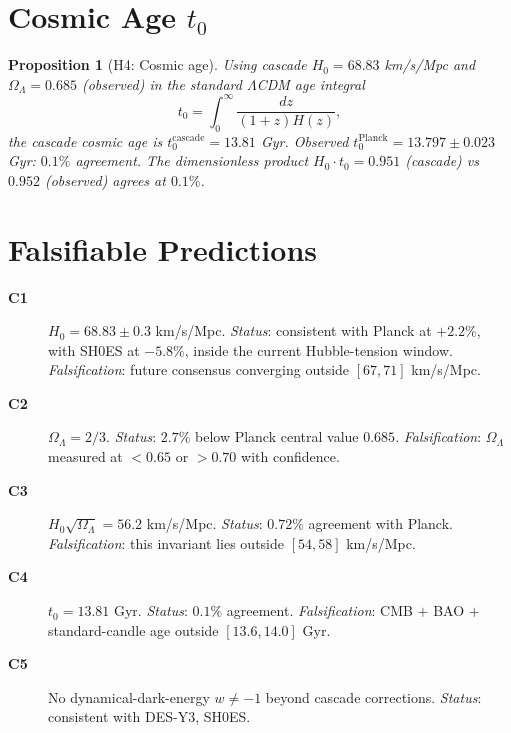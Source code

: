 \documentclass[12pt]{article}
\newtheorem{proposition}[theorem]{Proposition}
\theoremstyle{definition}
\theoremstyle{remark}
\begin{document}
\section{Cosmic Age $t_0$}\label{sec:age}

\begin{proposition}[H4: Cosmic age]\label{prop:age}
Using cascade $H_0 = 68.83$ km/s/Mpc and $\Omega_\Lambda = 0.685$ (observed) in the standard $\Lambda$CDM age integral
\begin{equation}
t_0 = \int_0^\infty \frac{dz}{(1+z) H(z)},
\end{equation}
the cascade cosmic age is $t_0^{\mathrm{cascade}} = 13.81$ Gyr. Observed $t_0^{\mathrm{Planck}} = 13.797 \pm 0.023$ Gyr: $0.1\%$ agreement. The dimensionless product $H_0 \cdot t_0 = 0.951$ (cascade) vs $0.952$ (observed) agrees at $0.1\%$.
\end{proposition}

\section{Falsifiable Predictions}\label{sec:predictions}

\begin{description}
\item[\textbf{C1}] $H_0 = 68.83 \pm 0.3$ km/s/Mpc. \emph{Status}: consistent with Planck at $+2.2\%$, with SH0ES at $-5.8\%$, inside the current Hubble-tension window. \emph{Falsification}: future consensus converging outside $[67, 71]$ km/s/Mpc.
\item[\textbf{C2}] $\Omega_\Lambda = 2/3$. \emph{Status}: $2.7\%$ below Planck central value $0.685$. \emph{Falsification}: $\Omega_\Lambda$ measured at $< 0.65$ or $> 0.70$ with confidence.
\item[\textbf{C3}] $H_0 \sqrt{\Omega_\Lambda} = 56.2$ km/s/Mpc. \emph{Status}: $0.72\%$ agreement with Planck. \emph{Falsification}: this invariant lies outside $[54, 58]$ km/s/Mpc.
\item[\textbf{C4}] $t_0 = 13.81$ Gyr. \emph{Status}: $0.1\%$ agreement. \emph{Falsification}: CMB $+$ BAO $+$ standard-candle age outside $[13.6, 14.0]$ Gyr.
\item[\textbf{C5}] No dynamical-dark-energy $w \neq -1$ beyond cascade corrections. \emph{Status}: consistent with DES-Y3, SH0ES.
\end{description}
\end{document}
